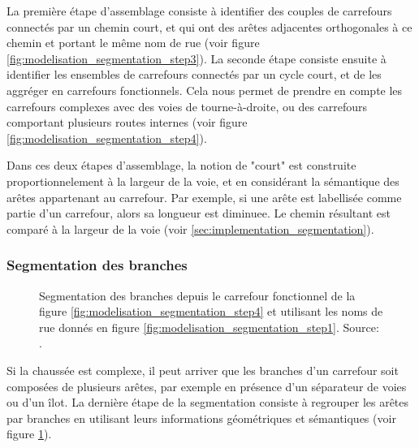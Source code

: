 \newpar{}

La première étape d'assemblage consiste à identifier des couples de carrefours connectés par un chemin court, et qui ont des arêtes adjacentes orthogonales à ce chemin et portant le même nom de rue (voir figure \ref{fig:modelisation_segmentation_step3}). La seconde étape consiste ensuite à identifier les ensembles de carrefours connectés par un cycle court, et de les aggréger en carrefours fonctionnels. Cela nous permet de prendre en compte les carrefours complexes avec des voies de tourne-à-droite, ou des carrefours comportant plusieurs routes internes (voir figure \ref{fig:modelisation_segmentation_step4}). 

\newpar{}

Dans ces deux étapes d'assemblage, la notion de "court" est construite proportionnelement à la largeur de la voie, et en considérant la sémantique des arêtes appartenant au carrefour. Par exemple, si une arête est labellisée comme partie d'un carrefour, alors sa longueur est diminuee. Le chemin résultant est comparé à la largeur de la voie (voir \ref{sec:implementation_segmentation}).

\subsubsection{Segmentation des branches}

\begin{figure}
    \centering
    \caption{Segmentation des branches depuis le carrefour fonctionnel de la figure \ref{fig:modelisation_segmentation_step4} et utilisant les noms de rue donnés en figure {\ref{fig:modelisation_segmentation_step1}}. Source: \cite{Favreau2022}.}
    \label{fig:modelisation_segmentation_step5}
\end{figure}

Si la chaussée est complexe, il peut arriver que les branches d'un carrefour soit composées de plusieurs arêtes, par exemple en présence d'un séparateur de voies ou d'un îlot. La dernière étape de la segmentation consiste à regrouper les arêtes par branches en utilisant leurs informations géométriques et sémantiques (voir figure \ref{fig:modelisation_segmentation_step5}).

